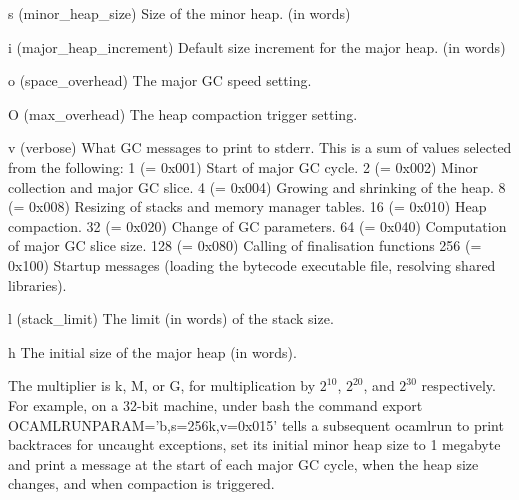 s
(minor\_heap\_size) Size of the minor heap. (in words)


i
(major\_heap\_increment) Default size increment for the major heap. (in
words)


o
(space\_overhead) The major GC speed setting.


O
(max\_overhead) The heap compaction trigger setting.


v
(verbose) What GC messages to print to stderr. This is a sum of values
selected from the following:
1 (= 0x001)
Start of major GC cycle.
2 (= 0x002)
Minor collection and major GC slice.
4 (= 0x004)
Growing and shrinking of the heap.
8 (= 0x008)
Resizing of stacks and memory manager tables.
16 (= 0x010)
Heap compaction.
32 (= 0x020)
Change of GC parameters.
64 (= 0x040)
Computation of major GC slice size.
128 (= 0x080)
Calling of finalisation functions
256 (= 0x100)
Startup messages (loading the bytecode executable file, resolving
shared libraries).


l
(stack\_limit) The limit (in words) of the stack size.


h
The initial size of the major heap (in words).


The multiplier is k, M, or G, for multiplication by $2^10$, $2^20$,
and $2^30$ respectively. For example, on a 32-bit machine, under bash the
command export OCAMLRUNPARAM='b,s=256k,v=0x015' tells a subsequent
ocamlrun to print backtraces for uncaught exceptions, set its initial
minor heap size to 1 megabyte and print a message at the start of each
major GC cycle, when the heap size changes, and when compaction is
triggered.

